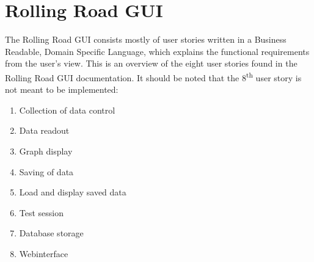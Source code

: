 \section{Rolling Road GUI}
The Rolling Road GUI consists mostly of user stories written in a Business Readable, Domain Specific Language, which explains the functional requirements from the user's view.
This is an overview of the eight user stories found in the Rolling Road GUI documentation\cite{GUI}. It should be noted that the 8\textsuperscript{th} user story is not meant to be implemented:

\begin{enumerate}[US1:]
	\item Collection of data control
	\item Data readout
	\item Graph display
	\item Saving of data
	\item Load and display saved data
	\item Test session
	\item Database storage
	\item Webinterface
\end{enumerate}